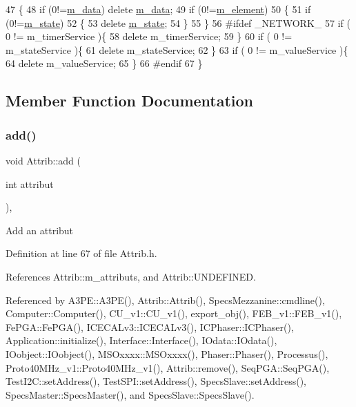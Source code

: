 \begin{DoxyCode}
47                       \{
48   \textcolor{keywordflow}{if} (0!=\hyperlink{classProcessus_a3da9a9de8af54e2f47807a3e09dfccff}{m\_data}) \textcolor{keyword}{delete} \hyperlink{classProcessus_a3da9a9de8af54e2f47807a3e09dfccff}{m\_data};
49   \textcolor{keywordflow}{if} (0!=\hyperlink{classProcessus_aa9d24d53c3e52f36786cabb5d8e296e7}{m\_element})
50   \{
51     \textcolor{keywordflow}{if} (0!=\hyperlink{classProcessus_ab3539eee42891ceae0baf4395ae7fb61}{m\_state})
52     \{
53       \textcolor{keyword}{delete} \hyperlink{classProcessus_ab3539eee42891ceae0baf4395ae7fb61}{m\_state};      
54     \}
55   \}
56 \textcolor{preprocessor}{#ifdef \_NETWORK\_}
57   \textcolor{keywordflow}{if} ( 0 != m\_timerService )\{
58     \textcolor{keyword}{delete} m\_timerService;
59   \}
60   \textcolor{keywordflow}{if} ( 0 != m\_stateService )\{
61     \textcolor{keyword}{delete} m\_stateService;
62   \}
63   \textcolor{keywordflow}{if} ( 0 != m\_valueService )\{
64     \textcolor{keyword}{delete} m\_valueService;
65   \}
66 \textcolor{preprocessor}{#endif}
67 \}
\end{DoxyCode}


\subsection{Member Function Documentation}
\mbox{\label{classAttrib_a235f773af19c900264a190b00a3b4ad7}} 
\subsubsection{\texorpdfstring{add()}{add()}}
{\footnotesize\ttfamily void Attrib\+::add (\begin{DoxyParamCaption}\item[{int}]{attribut }\end{DoxyParamCaption})\hspace{0.3cm}{\ttfamily [inline]}, {\ttfamily [inherited]}}

Add an attribut 

Definition at line 67 of file Attrib.\+h.



References Attrib\+::m\+\_\+attributs, and Attrib\+::\+U\+N\+D\+E\+F\+I\+N\+ED.



Referenced by A3\+P\+E\+::\+A3\+P\+E(), Attrib\+::\+Attrib(), Specs\+Mezzanine\+::cmdline(), Computer\+::\+Computer(), C\+U\+\_\+v1\+::\+C\+U\+\_\+v1(), export\+\_\+obj(), F\+E\+B\+\_\+v1\+::\+F\+E\+B\+\_\+v1(), Fe\+P\+G\+A\+::\+Fe\+P\+G\+A(), I\+C\+E\+C\+A\+Lv3\+::\+I\+C\+E\+C\+A\+Lv3(), I\+C\+Phaser\+::\+I\+C\+Phaser(), Application\+::initialize(), Interface\+::\+Interface(), I\+Odata\+::\+I\+Odata(), I\+Oobject\+::\+I\+Oobject(), M\+S\+Oxxxx\+::\+M\+S\+Oxxxx(), Phaser\+::\+Phaser(), Processus(), Proto40\+M\+Hz\+\_\+v1\+::\+Proto40\+M\+Hz\+\_\+v1(), Attrib\+::remove(), Seq\+P\+G\+A\+::\+Seq\+P\+G\+A(), Test\+I2\+C\+::set\+Address(), Test\+S\+P\+I\+::set\+Address(), Specs\+Slave\+::set\+Address(), Specs\+Master\+::\+Specs\+Master(), and Specs\+Slave\+::\+Specs\+Slave().


